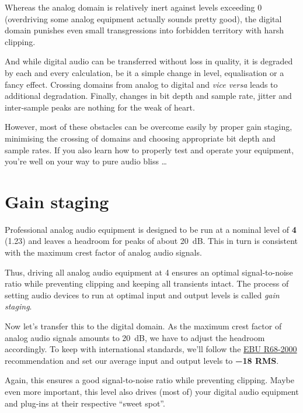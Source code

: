 Whereas the analog domain is relatively inert against levels exceeding
\SI{0}{\dBFS} (overdriving some analog equipment actually sounds
pretty good), the digital domain punishes even small transgressions
into forbidden territory with harsh clipping.

And while digital audio can be transferred without loss in quality, it
is degraded by each and every calculation, be it a simple change in
level, equalisation or a fancy effect.  Crossing domains from analog
to digital and \emph{vice versa} leads to additional degradation.
Finally, changes in bit depth and sample rate, jitter and inter-sample
peaks are nothing for the weak of heart.

However, most of these obstacles can be overcome easily by proper gain
staging, minimising the crossing of domains and choosing appropriate
bit depth and sample rates.  If you also learn how to properly test
and operate your equipment, you're well on your way to pure audio
bliss \dots

\section{Gain staging}
\label{sec:gain_staging}

Professional analog audio equipment is designed to be run at a nominal
level of \textbf{\SI[addsign=all]{+4}{\dBu}} (\SI{1.23}{\VRMS}) and
leaves a headroom for peaks of about \SI{20}{\dB}.  This in turn is
consistent with the maximum crest factor of analog audio signals.

Thus, driving all analog audio equipment at \SI[addsign=all]{+4}{\dBu}
ensures an optimal signal-to-noise ratio while preventing clipping and
keeping all transients intact.  The process of setting audio devices
to run at optimal input and output levels is called \emph{gain
  staging}.

Now let's transfer this to the digital domain.  As the maximum crest
factor of analog audio signals amounts to \SI{20}{\dB}, we have to
adjust the headroom accordingly.  To keep with international
standards, we'll follow the
\href{http://tech.ebu.ch/publications/r068}{EBU R68-2000}
recommendation and set our average input and output levels to
\textbf{\SI{-18}{\dBFS} RMS}.

Again, this ensures a good signal-to-noise ratio while preventing
clipping.  Maybe even more important, this level also drives (most of)
your digital audio equipment and plug-ins at their respective ``sweet
spot''.

